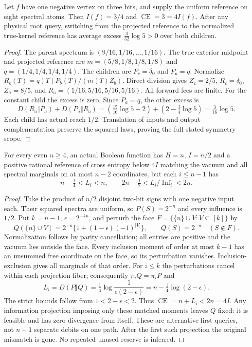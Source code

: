 \begin{proposition}
\label{prop:v12-forward}
Let $f$ have one negative vertex on three bits, and supply the uniform reference on
eight spectral atoms. Then $I(f)=3/4$ and $\operatorname{CE}=3=4I(f)$.
After any physical root query, switching from the projected reference to the normalized
true-kernel reference has average excess $\frac3{32}\log5>0$ over both children.
\end{proposition}
\begin{proof}
The parent spectrum is $(9/16,1/16,\ldots,1/16)$.
The true exterior midpoint and projected reference are
$m=(5/8,1/8,1/8,1/8)$ and $q=(1/4,1/4,1/4,1/4)$.
The children are $P_c=\delta_0$ and $P_a=q$. Normalize
$R_b(T)=q(T)P_b(T)/(m(T)Z_b)$.
Direct division gives $Z_c=2/5$, $R_c=\delta_0$, $Z_a=8/5$, and
$R_a=(1/16,5/16,5/16,5/16)$. All forward fees are finite.
For the constant child the excess is zero. Since $P_a=q$, the other excess is
\[
 D(R_a\Vert P_a)+D(P_a\Vert R_a)
 =\left(\tfrac{15}{16}\log5-2\right)
  +\left(2-\tfrac34\log5\right)=\tfrac3{16}\log5.
\]
Each child has actual reach $1/2$. Translation of inputs and output complementation
preserve the squared laws, proving the full stated symmetry scope.
\end{proof}

\begin{proposition}
\label{prop:v12-moment}
For every even $n\geq4$, an actual Boolean function has $H=n$, $I=n/2$ and a positive
rational reference of cross entropy below $4I$ matching the vacuum and all spectral
marginals on at most $n-2$ coordinates, but each $i\leq n-1$ has
\[
 n-\tfrac14<L_i<n,\qquad 2n-\tfrac12<L_i/\operatorname{Inf}_i<2n.
\]
\end{proposition}
\begin{proof}
Take the product of $n/2$ disjoint two-bit signs with one negative input each.
Their squared spectra are uniform, so $P(S)=2^{-n}$ and every influence is $1/2$.
Put $k=n-1$, $\epsilon=2^{-4n}$, and perturb the face
$F=\{\{n\}\cup V:V\subseteq[k]\}$ by
\[
 Q(\{n\}\cup V)=2^{-n}\{1+(1-\epsilon)(-1)^{|V|}\},
 \qquad Q(S)=2^{-n}\quad(S\notin F).
\]
Normalization follows by parity cancellation; all entries are positive and the
vacuum lies outside the face. Every inclusion moment of order at most $k-1$ has an
unsummed free coordinate on the face, so its perturbation vanishes.
Inclusion-exclusion gives all marginals of that order. For $i\leq k$ the perturbations
cancel within each projection fiber; consequently $\pi_iQ=\pi_iP$ and
\[
 L_i=D(P\Vert Q)=\tfrac14\log\frac1{\epsilon(2-\epsilon)}
                =n-\tfrac14\log(2-\epsilon).
\]
The strict bounds follow from $1<2-\epsilon<2$. Thus $\operatorname{CE}=n+L_i<2n=4I$.
Any information projection imposing only these matched moments leaves $Q$ fixed:
it is feasible and has zero divergence from itself. These are alternative first
queries, not $n-1$ separate debits on one path. After the first such projection the
original mismatch is gone. No repeated unused reserve is inferred.
\end{proof}


